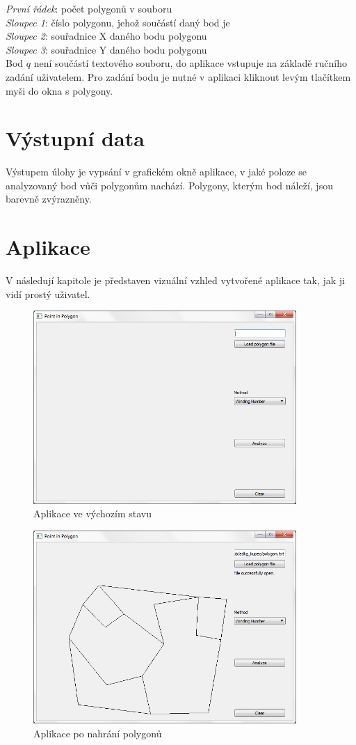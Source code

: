 \documentclass[a4paper, 12pt]{article}
\begin{document}
\noindent
\textsl{První řádek}: počet polygonů v souboru\\
\textsl{Sloupec 1}: číslo polygonu, jehož součástí daný bod je\\
\textsl{Sloupec 2}: souřadnice X daného bodu polygonu\\
\textsl{Sloupec 3}: souřadnice Y daného bodu polygonu\\

Bod $q$ není součástí textového souboru, do aplikace vstupuje na základě ručního zadání uživatelem. Pro zadání bodu je nutné v aplikaci kliknout levým tlačítkem myši do okna s polygony.

\section{Výstupní data}
Výstupem úlohy je vypsání v grafickém okně aplikace, v jaké poloze se analyzovaný bod vůči polygonům nachází. Polygony, kterým bod náleží, jsou barevně zvýrazněny.

\section{Aplikace}
V následují kapitole je představen vizuální vzhled vytvořené aplikace tak, jak ji vidí prostý uživatel.

\begin{figure}[h!]
	\centering
	\includegraphics[width=10cm]{./pictures/gui_default.png}
	\caption{Aplikace ve výchozím stavu}
\end{figure}

\begin{figure}[h!]
	\centering
	\includegraphics[width=10cm]{./pictures/gui_load.png}
	\caption{Aplikace po nahrání polygonů}
\end{figure}
\end{document}
